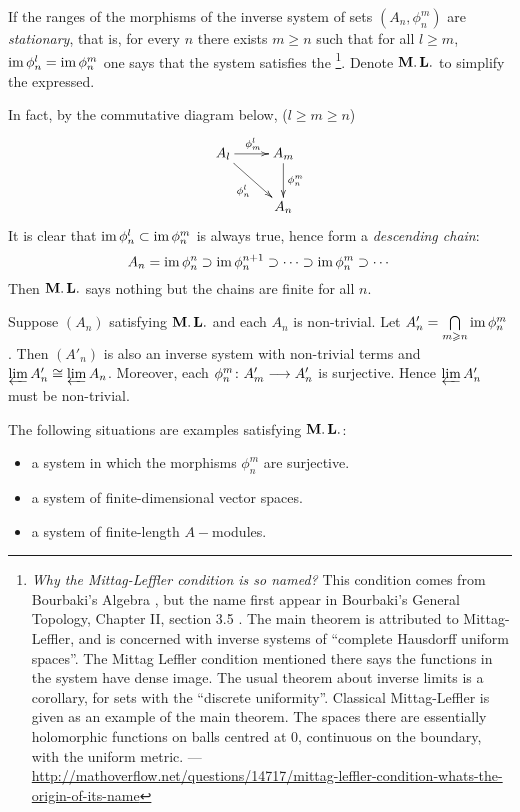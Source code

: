   \begin{defn}
    If the ranges of the morphisms of the inverse system of sets $(A_n, \phi^m_n)$ are \emph{stationary},
    that is, for every $n$ there exists $m \geqslant n$ such that for all $l \geqslant m$, $\operatorname{im} \phi^l_n=\operatorname{im} \phi^m_n$ one says that the system satisfies the 
    \footnote{\emph{Why the Mittag-Leffler condition is so named?} This condition comes from Bourbaki's Algebra \cite{bourbaki1998algebra}, but the name first appear in Bourbaki's General Topology, Chapter II, section 3.5 \cite{bourbaki1998general}. The main theorem is attributed to Mittag-Leffler, and is concerned with inverse systems of ``complete Hausdorff uniform spaces''.
    The Mittag Leffler condition mentioned there says the functions in the system have dense image. The usual theorem about inverse limits is a corollary, for sets with the ``discrete uniformity''.
    Classical Mittag-Leffler is given as an example of the main theorem. The spaces there are essentially holomorphic functions on balls centred at $0$, continuous on the boundary, with the uniform metric.
    --- \url{http://mathoverflow.net/questions/14717/mittag-leffler-condition-whats-the-origin-of-its-name}}.
     Denote $\operatorname{\mathbf{M.L.}}$ to simplify the expressed.
  \end{defn}

  In fact, by the commutative diagram below, ($l\geqslant m\geqslant n$)
        \begin{displaymath}
          \xymatrix{
               A_l\ar[r]^{\phi^l_m}\ar[dr]_{\phi^l_n} & A_m\ar[d]^{\phi^m_n} \\
               & A_n                 }
        \end{displaymath}
  It is clear that $\operatorname{im} \phi^l_n \subset \operatorname{im} \phi^m_n$ is always true, hence form a \emph{descending chain}:
  \begin{equation*}
    A_n=\operatorname{im} \phi^n_n \supset \operatorname{im} \phi^{n+1}_n \supset \cdots \supset \operatorname{im} \phi^m_n \supset \cdots
  \end{equation*}
  Then $\operatorname{\mathbf{M.L.}}$ says nothing but the chains are finite for all $n$.

  Suppose $(A_n)$ satisfying $\operatorname{\mathbf{M.L.}}$ and each $A_n$ is non-trivial. Let $A'_n=\bigcap\limits_{m\geqslant n}\operatorname{im} \phi^m_n$.
  Then $(A'_n)$ is also an inverse system with non-trivial terms and $\operatorname*{\underleftarrow{\lim}} A'_n \cong \operatorname*{\underleftarrow{\lim}} A_n$. Moreover, each $\phi^m_n\colon A'_m\longrightarrow A'_n$ is surjective.
  Hence $\operatorname*{\underleftarrow{\lim}} A'_n$ must be non-trivial.

  \begin{exam}
    The following situations are examples satisfying $\operatorname{\mathbf{M.L.}}$:
    \begin{itemize}
      \item a system in which the morphisms $\phi^m_n$ are surjective.
      \item a system of finite-dimensional vector spaces.
      \item a system of finite-length $A-$modules.
    \end{itemize}
  \end{exam}

